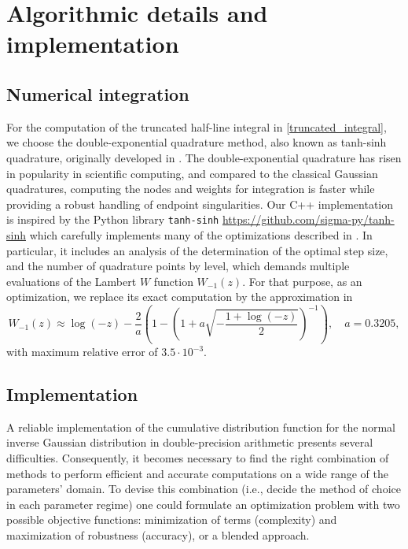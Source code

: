 \documentclass[10pt,a4paper,oneside]{article}
\numberwithin{equation}{section}
\begin{document}
\section{Algorithmic details and implementation}
\subsection{Numerical integration}\label{algorithmic_numerical_integration}
For the computation of the truncated half-line integral in \eqref{truncated_integral}, we choose the double-exponential quadrature method, also known as tanh-sinh quadrature, originally developed in \cite{Takahasi1973}. The double-exponential quadrature has risen in popularity in scientific computing, and compared to the classical Gaussian quadratures, computing the nodes and weights for integration is faster while providing a robust handling of endpoint singularities. Our C++ implementation is inspired by the Python library \texttt{tanh-sinh} \url{https://github.com/sigma-py/tanh-sinh} which carefully implements many of the optimizations described in \cite{Bailey2006TanhSinhHQ}. In particular, it includes an analysis of the determination of the optimal step size, and the number of quadrature points by level, which demands multiple evaluations of the Lambert $W$ function $W_{-1}(z)$. For that purpose, as an optimization, we replace its exact computation by the approximation in \cite{Barry2004}
\begin{equation}
W_{-1}(z) \approx \log(-z) - \frac{2}{a} \left(1 - \left(1 + a \sqrt{-\frac{1 + \log(-z)}{2}}\right)^{-1}\right), \quad	a = 0.3205,
\end{equation}
with maximum relative error of $3.5\cdot 10^{-3}$.

\subsection{Implementation}\label{subsection_implementation}
A reliable implementation of the cumulative distribution function for the normal inverse Gaussian distribution in double-precision arithmetic presents several difficulties. Consequently, it becomes necessary to find the right combination of methods to perform efficient and accurate computations on a wide range of the parameters' domain. To devise this combination (i.e., decide the method of choice in each parameter regime) one could formulate an optimization problem with two possible objective functions: minimization of terms (complexity) and maximization of robustness (accuracy), or a blended approach.
\end{document}
